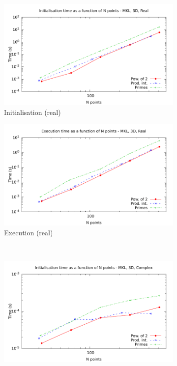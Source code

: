 \documentclass[12pt, a4paper]{article} \setlength{\textheight}{24cm}
\begin{document}
\begin{figure}[H]
  \centering
  \begin{subfigure}{.5\textwidth}
    \centering
    \includegraphics[width=.9\linewidth]{graphs/3d-mkl-init-r.pdf}
    \caption{Initialisation (real)}
    \label{3DMKLRI}
  \end{subfigure}%
  \begin{subfigure}{.5\textwidth}
    \centering
    \includegraphics[width=.9\linewidth]{graphs/3d-mkl-exec-r.pdf}
    \caption{Execution (real)}
    \label{3DMKLR}
  \end{subfigure}\\
  \begin{subfigure}{.5\textwidth}
    \centering
    \includegraphics[width=.9\linewidth]{graphs/3d-mkl-init-c.pdf}

\end{subfigure}
\end{figure}
\end{document}
